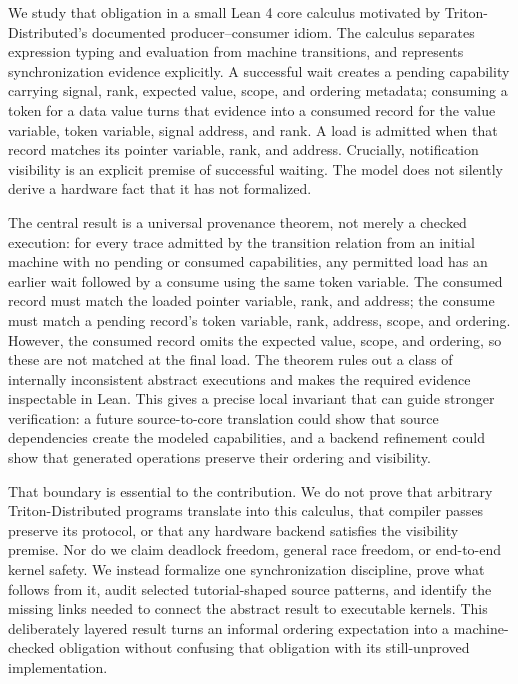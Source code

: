 \documentclass[a4paper,USenglish]{lipics-v2021}
\begin{document}
We study that obligation in a small Lean 4 core calculus motivated by Triton-Distributed's documented producer--consumer idiom. The calculus separates expression typing and evaluation from machine transitions, and represents synchronization evidence explicitly. A successful wait creates a pending capability carrying signal, rank, expected value, scope, and ordering metadata; consuming a token for a data value turns that evidence into a consumed record for the value variable, token variable, signal address, and rank. A load is admitted when that record matches its pointer variable, rank, and address. Crucially, notification visibility is an explicit premise of successful waiting. The model does not silently derive a hardware fact that it has not formalized.

The central result is a universal provenance theorem, not merely a checked execution: for every trace admitted by the transition relation from an initial machine with no pending or consumed capabilities, any permitted load has an earlier wait followed by a consume using the same token variable. The consumed record must match the loaded pointer variable, rank, and address; the consume must match a pending record's token variable, rank, address, scope, and ordering. However, the consumed record omits the expected value, scope, and ordering, so these are not matched at the final load. The theorem rules out a class of internally inconsistent abstract executions and makes the required evidence inspectable in Lean. This gives a precise local invariant that can guide stronger verification: a future source-to-core translation could show that source dependencies create the modeled capabilities, and a backend refinement could show that generated operations preserve their ordering and visibility.

That boundary is essential to the contribution. We do not prove that arbitrary Triton-Distributed programs translate into this calculus, that compiler passes preserve its protocol, or that any hardware backend satisfies the visibility premise. Nor do we claim deadlock freedom, general race freedom, or end-to-end kernel safety. We instead formalize one synchronization discipline, prove what follows from it, audit selected tutorial-shaped source patterns, and identify the missing links needed to connect the abstract result to executable kernels. This deliberately layered result turns an informal ordering expectation into a machine-checked obligation without confusing that obligation with its still-unproved implementation.
\end{document}
